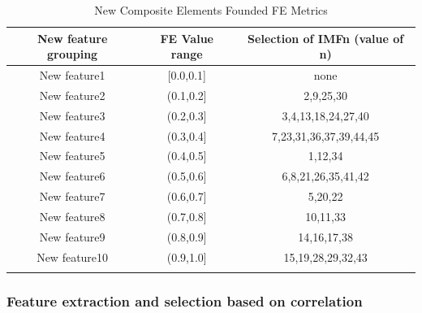 \documentclass[sn-mathphys,Numbered]{sn-jnl}
\theoremstyle{thmstyleone}%
\theoremstyle{thmstyletwo}%
\theoremstyle{thmstylethree}%
\begin{document}
\begin{table}[h]
\caption{New Composite Elements Founded FE Metrics}\label{tab_4}%
\begin{tabular}{@{}ccc@{}}
\toprule
New feature grouping & FE Value range & 
Selection of IMFn (value of n)  \\
\midrule
New feature1     & [0.0,0.1]   & none \\
New feature2     & (0.1,0.2]   & 2,9,25,30 \\
New feature3     & (0.2,0.3]   & 3,4,13,18,24,27,40 \\
New feature4     & (0.3,0.4]   & 7,23,31,36,37,39,44,45 \\
New feature5     & (0.4,0.5]   & 1,12,34 \\
New feature6     & (0.5,0.6]   & 6,8,21,26,35,41,42 \\
New feature7     & (0.6,0.7]   & 5,20,22 \\
New feature8     & (0.7,0.8]   & 10,11,33 \\
New feature9     & (0.8,0.9]   & 14,16,17,38 \\
New feature10    & (0.9,1.0]   & 15,19,28,29,32,43 \\

\botrule
\end{tabular}
\end{table}



\subsubsection{Feature extraction and selection based on correlation}\label{subsubsec3}
\end{document}
